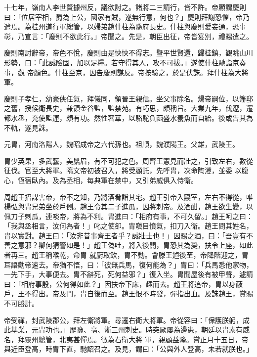 \begin{pinyinscope}
 十七年，嶺南人李世賢據州反，議欲討之。諸將二三請行，皆不許。帝顧謂慶則曰：「位居宰相，爵為上公，國家有賊，遂無行意，何也？」慶則拜謝恐懼，帝乃遣焉。為桂州道行軍總管，以婦弟趙什柱為隨府長史。什柱與慶則愛妾通，恐事彰，乃宣言：「慶則不欲此行。」帝聞之。先是，朝臣出征，帝皆宴別，禮賜遣之。



 慶則南討辭帝，帝色不悅，慶則由是怏怏不得志。暨平世賢還，歸桂鎮，觀眺山川形勢，曰：「此誠險固，加以足糧。若守得其人，攻不可拔。」遂使什柱馳詣京奏事，觀
 帝顏色。什柱至京，因告慶則謀反。帝按驗之，於是伏誅。拜什柱為大將軍。



 慶則子孝仁，幼豪俠任氣，拜儀同，領晉王親信。坐父事除名。煬帝嗣位，以籓邸之舊，授候衛長史，兼領金谷監，監禁苑。有巧思，頗稱旨。大業九年，伐遼，遷都水丞，充使監運，頗有功。然性奢華，以駱駝負函盛水養魚而自給。後或告其為不軌，遂見誅。



 元胄，河南洛陽人，魏昭成帝之六代孫也。祖順，魏濮陽王。父雄，武陵王。



 胄少英果，多武藝，美鬚眉，有不可犯之色。周齊王憲見而壯之，引致左右，數從征伐。官至大將軍。隋文帝初被召入，將受顧託，先呼胄，次命陶澄，並委
 以腹心，恆宿臥內。及為丞相，每典軍在禁中，又引弟威俱入侍衛。



 周趙王招謀害帝，帝不之知，乃將酒肴詣其宅。趙王引帝入寢室，左右不得從，唯楊弘與胄兄弟坐於戶側。趙王令其二子進瓜，因將刺帝。及酒酣，趙王欲生變，以佩刀子剌瓜，連啖帝，將為不利。胄進曰：「相府有事，不可久留。」趙王呵之曰：「我與丞相言，汝何為者！」叱之使卻。胄瞋目憤氣，扣刀入衛。趙王問其姓名，胄以實對。趙王曰：「汝非昔事齊王者乎？誠壯士也！」因賜之酒，曰：「吾豈有不善之意邪？卿何猜警如是！」趙王偽吐，將入後閤，胄恐其為變，扶令上座，如此者再三。趙王稱喉乾，命胄
 就廚取飲，胄不動。會滕王逌後至，帝降階迎之，胄耳語勸帝速去。帝猶不悟，曰：「彼無兵馬，復何能為？」胄曰：「兵馬悉他家物，一先下手，大事便去。胄不辭死，死何益邪？」復入坐。胄聞屋後有被甲聲，遽請曰：「相府事殷，公何得如此？」因扶帝下床，趣而去。趙王將追帝，胄以身蔽戶，王不得出。帝及門，胄自後而至。趙王恨不時發，彈指出血。及誅趙王，賞賜不可勝計。



 帝受禪，封武陵郡公，拜左衛將軍。尋遷右衛大將軍。帝從容曰：「保護朕躬，成此基業，元胄功也。」歷豫、亳、淅三州刺史。時突厥屢為邊患，朝廷以胄素有威名，拜靈州總管，北夷甚憚焉。徵為右衛大將
 軍，親顧益隆。嘗正月十五日，帝與近臣登高，時胄下直，馳詔召之。及見，謂曰：「公與外人登高，未若就朕也。」




\end{pinyinscope}
